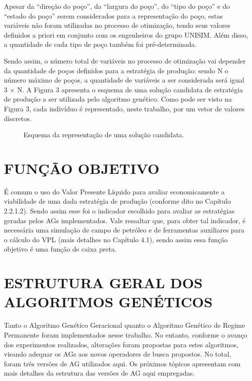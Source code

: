 Apesar da “direção do poço”, da “largura do poço”, do “tipo do poço” e do “estado do poço” serem considerados para a representação do poço, estas variáveis não foram utilizadas no processo de otimização, tendo seus valores definidos a priori em conjunto com os engenheiros do grupo UNISIM. Além disso, a quantidade de cada tipo de poço também foi pré-determinada. 

Sendo assim, o número total de variáveis no processo de otimização vai depender da quantidade de poços definidos para a estratégia de produção: sendo N o número máximo de poços, a quantidade de variáveis a ser considerada será igual 3 $\times$ N. A Figura 3 apresenta o esquema de uma solução candidata de estratégia de produção a ser utilizada pelo algoritmo genético. Como pode ser visto na Figura 3, cada indivíduo é representado, neste trabalho, por um vetor de valores discretos.

\begin{figure}[htb]

\caption{Esquema da representação de uma solução candidata.}

\end{figure}

\section{FUNÇÃO OBJETIVO}

É comum o uso do Valor Presente Líquido para avaliar economicamente a viabilidade de uma dada estratégia de produção (conforme dito no Capítulo 2.2.1.2). Sendo assim esse foi o indicador escolhido para avaliar as estratégias geradas pelos AGs implementados. Vale ressaltar que, para obter tal indicador, é necessária uma simulação de campo de petróleo e de ferramentas auxiliares para o cálculo do VPL (mais detalhes no Capítulo 4.1), sendo assim essa função objetivo é uma função de caixa preta. 

\section{ESTRUTURA GERAL DOS ALGORITMOS GENÉTICOS}

Tanto o Algoritmo Genético Geracional quanto o Algoritmo Genético de Regime Permanente foram implementados nesse trabalho. No entanto, conforme o avanço dos experimentos realizados, alterações foram propostas para estes algoritmos, visando adequar os AGs aos novos operadores de busca propostos.  No total, foram três versões de AG utilizados aqui.  Os próximos tópicos apresentam com mais detalhes da estrutura das versões de AG aqui empregadas.

